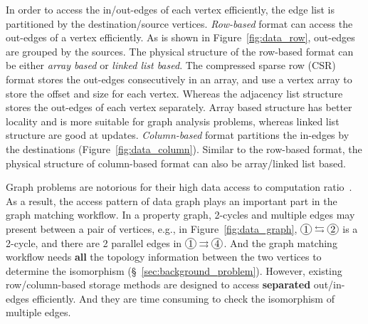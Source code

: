 In order to access the in/out-edges of each vertex efficiently, the edge list is partitioned by the destination/source vertices.
\emph{Row-based} format can access the out-edges of a vertex efficiently.
As is shown in Figure~\ref{fig:data_row}, out-edges are grouped by the sources.
The physical structure of the row-based format can be either \emph{array based} or \emph{linked list based}.
The compressed sparse row (CSR) format stores the out-edges consecutively in an array, and use a vertex array to store the offset and size for each vertex.
Whereas the adjacency list structure stores the out-edges of each vertex separately.
Array based structure has better locality and is more suitable for graph analysis problems, whereas linked list structure are good at updates.
\emph{Column-based} format partitions the in-edges by the destinations (Figure~\ref{fig:data_column}).
Similar to the row-based format, the physical structure of column-based format can also be array/linked list based.

Graph problems are notorious for their high data access to computation ratio~\cite{DBLP:journals/ppl/LumsdaineGHB07}.
As a result, the access pattern of data graph plays an important part in the graph matching workflow.
In a property graph, 2-cycles and multiple edges may present between a pair of vertices,
e.g., in Figure~\ref{fig:data_graph}, $\circled{1} \leftrightarrows \circled{2}$ is a 2-cycle,
and there are 2 parallel edges in $\circled{1} \rightrightarrows \circled{4}$.
And the graph matching workflow needs \textbf{all} the topology information between the two vertices to determine the isomorphism (\S~\ref{sec:background_problem}).
However, existing row/column-based storage methods are designed to access \textbf{separated} out/in-edges efficiently.
And they are time consuming to check the isomorphism of multiple edges.


